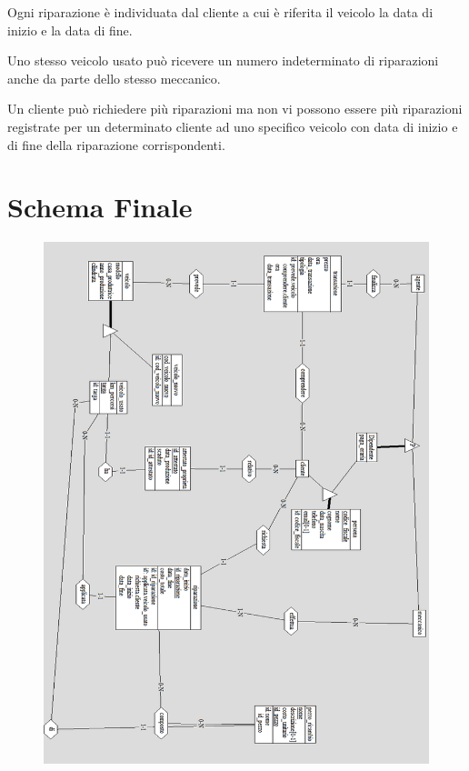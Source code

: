 \documentclass[a4paper,12pt]{report}
\begin{document}
Ogni riparazione è individuata dal cliente a cui è riferita il veicolo la data di inizio e la data di fine.

Uno stesso veicolo usato può ricevere un numero indeterminato di riparazioni anche da parte dello stesso meccanico.

Un cliente può richiedere più riparazioni ma non vi possono essere più riparazioni registrate per un determinato cliente ad uno 
%
specifico veicolo con data di inizio e di fine della riparazione corrispondenti.

\section{Schema Finale}
	\begin{figure}[H]
		\centering
		\includegraphics[scale=1]{img/schema_finale.png}
	\end{figure}
\end{document}
